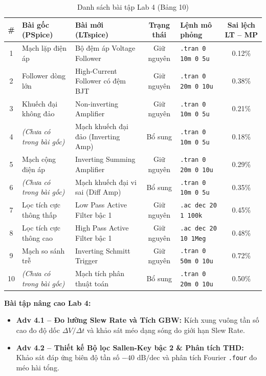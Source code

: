 \documentclass[12pt,a4paper]{report}
\begin{document}
\begin{table}[H]
\centering
\caption{Danh sách bài tập Lab 4 (Bảng 10)}
\label{tab:bang10_lab4}
\renewcommand{\arraystretch}{1.2}
\small
\begin{tabularx}{\textwidth}{|c|p{4.0cm}|p{4.0cm}|c|l|c|}
\hline
\rowcolor{codebg}
\textbf{\#} & \textbf{Bài gốc (PSpice)} & \textbf{Bài mới (LTspice)} & \textbf{Trạng thái} & \textbf{Lệnh mô phỏng} & \textbf{Sai lệch LT -- MP} \\ \hline
1 & Mạch lặp điện áp & Bộ đệm áp Voltage Follower & Giữ nguyên & \lstinline|.tran 0 10m 0 5u| & 0.12\% \\ \hline
2 & Follower dòng lớn & High-Current Follower có đệm BJT & Giữ nguyên & \lstinline|.tran 0 20m 0 10u| & 0.38\% \\ \hline
3 & Khuếch đại không đảo & Non-inverting Amplifier & Giữ nguyên & \lstinline|.tran 0 10m 0 5u| & 0.21\% \\ \hline
4 & \textit{(Chưa có trong bài gốc)} & Mạch khuếch đại đảo (Inverting Amp) & Bổ sung & \lstinline|.tran 0 10m 0 5u| & 0.18\% \\ \hline
5 & Mạch cộng điện áp & Inverting Summing Amplifier & Giữ nguyên & \lstinline|.tran 0 20m 0 10u| & 0.29\% \\ \hline
6 & \textit{(Chưa có trong bài gốc)} & Mạch khuếch đại vi sai (Diff Amp) & Bổ sung & \lstinline|.tran 0 10m 0 5u| & 0.35\% \\ \hline
7 & Lọc tích cực thông thấp & Low Pass Active Filter bậc 1 & Giữ nguyên & \lstinline|.ac dec 20 1 100k| & 0.45\% \\ \hline
8 & Lọc tích cực thông cao & High Pass Active Filter bậc 1 & Giữ nguyên & \lstinline|.ac dec 20 10 1Meg| & 0.48\% \\ \hline
9 & Mạch so sánh trễ & Inverting Schmitt Trigger & Giữ nguyên & \lstinline|.tran 0 50m 0 10u| & 0.72\% \\ \hline
10 & \textit{(Chưa có trong bài gốc)} & Mạch tích phân thuật toán & Bổ sung & \lstinline|.tran 0 20m 0 10u| & 0.50\% \\ \hline
\end{tabularx}
\end{table}

\textbf{Bài tập nâng cao Lab 4:}
\begin{itemize}[noitemsep]
    \item \textbf{Adv 4.1 -- Đo lường Slew Rate và Tích GBW:} Kích xung vuông tần số cao đo độ dốc $\Delta V/\Delta t$ và khảo sát méo dạng sóng do giới hạn Slew Rate.
    \item \textbf{Adv 4.2 -- Thiết kế Bộ lọc Sallen-Key bậc 2 \& Phân tích THD:} Khảo sát đáp ứng biên độ tần số $-40\text{ dB/dec}$ và phân tích Fourier \lstinline|.four| đo méo hài tổng.
\end{itemize}
\end{document}
